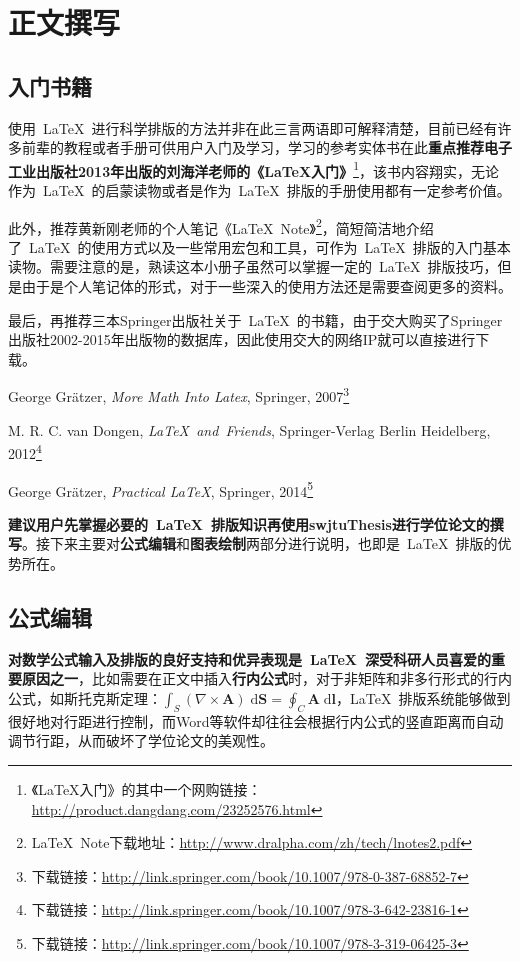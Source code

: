 \section{正文撰写}

\subsection{入门书籍}
使用~\LaTeX{}~进行科学排版的方法并非在此三言两语即可解释清楚，目前已经有许多前辈的教程或者手册可供用户入门及学习，学习的参考实体书在此\textbf{重点推荐电子工业出版社2013年出版的刘海洋老师的《\LaTeX{}入门》}\footnote{《\LaTeX{}入门》的其中一个网购链接：\url{http://product.dangdang.com/23252576.html}}，该书内容翔实，无论作为~\LaTeX{}~的启蒙读物或者是作为~\LaTeX{}~排版的手册使用都有一定参考价值。

此外，推荐黄新刚老师的个人笔记《\LaTeX{}~Note》\footnote{\LaTeX{}~Note下载地址：\url{http://www.dralpha.com/zh/tech/lnotes2.pdf}}，简短简洁地介绍了~\LaTeX{}~的使用方式以及一些常用宏包和工具，可作为~\LaTeX{}~排版的入门基本读物。需要注意的是，熟读这本小册子虽然可以掌握一定的~\LaTeX{}~排版技巧，但是由于是个人笔记体的形式，对于一些深入的使用方法还是需要查阅更多的资料。

最后，再推荐三本Springer出版社关于~\LaTeX{}~的书籍，由于交大购买了Springer出版社2002-2015年出版物的数据库，因此使用交大的网络IP就可以直接进行下载。
\begin{publist}
	\item George Grätzer, \emph{More Math Into Latex}, Springer, 2007\footnote{下载链接：\url{http://link.springer.com/book/10.1007/978-0-387-68852-7}}
	\item M. R. C. van Dongen, \emph{\LaTeX{}~and~Friends}, Springer-Verlag Berlin Heidelberg, 2012\footnote{下载链接：\url{http://link.springer.com/book/10.1007/978-3-642-23816-1}}
	\item George Grätzer, \emph{Practical LaTeX}, Springer, 2014\footnote{下载链接：\url{http://link.springer.com/book/10.1007/978-3-319-06425-3}}
\end{publist}

\textbf{建议用户先掌握必要的~\LaTeX{}~排版知识再使用swjtuThesis进行学位论文的撰写}。接下来主要对\textbf{公式编辑}和\textbf{图表绘制}两部分进行说明，也即是~\LaTeX{}~排版的优势所在。

\subsection{公式编辑}
\textbf{对数学公式输入及排版的良好支持和优异表现是~\LaTeX{}~深受科研人员喜爱的重要原因之一}，比如需要在正文中插入\textbf{行内公式}时，对于非矩阵和非多行形式的行内公式，如斯托克斯定理：$\int_S\left( \nabla\times \mathbf{A}\right)  \;\mathrm{d}\mathbf{S}=\oint_C \mathbf{A} \;\mathrm{d}\mathbf{l}$，\LaTeX{}~排版系统能够做到很好地对行距进行控制，而Word等软件却往往会根据行内公式的竖直距离而自动调节行距，从而破坏了学位论文的美观性。

